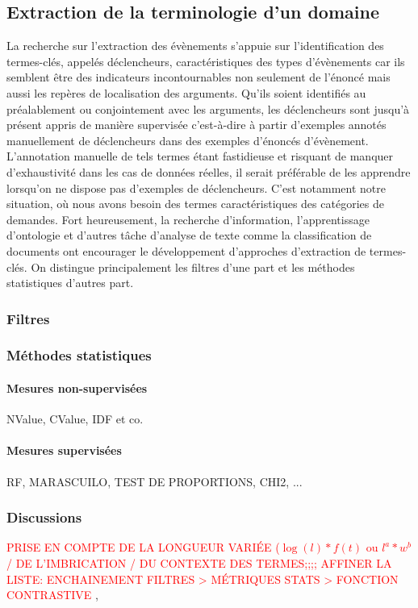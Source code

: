 \subsection{Extraction de la terminologie d'un domaine}
La recherche sur l'extraction des évènements s'appuie sur l'identification des termes-clés, appelés déclencheurs, caractéristiques des types d'évènements car ils semblent être des indicateurs incontournables non seulement de l'énoncé mais aussi les repères de localisation des arguments. Qu'ils soient identifiés au préalablement ou conjointement avec les arguments, les déclencheurs sont jusqu'à présent appris de manière supervisée c'est-à-dire à partir d'exemples annotés manuellement de déclencheurs dans des exemples d'énoncés d'évènement. L'annotation manuelle de tels termes étant fastidieuse et risquant de manquer d'exhaustivité dans les cas de données réelles, il serait préférable de les apprendre lorsqu'on ne dispose pas d'exemples de déclencheurs. C'est notamment notre situation, où nous avons besoin des termes caractéristiques des catégories de demandes. Fort heureusement, la recherche d'information, l'apprentissage d'ontologie et d'autres tâche d'analyse de texte comme la classification de documents ont encourager le développement d'approches d'extraction de termes-clés. On distingue principalement les filtres d'une part et les méthodes statistiques d'autres part.



\subsubsection{Filtres}
\subsubsection{Méthodes statistiques}
\paragraph{Mesures non-supervisées}
NValue, CValue, IDF et co.
\paragraph{Mesures supervisées}
RF, MARASCUILO, TEST DE PROPORTIONS, CHI2, ...
\subsubsection{Discussions}
\textcolor{red}{PRISE EN COMPTE DE LA LONGUEUR VARIÉE ($\log(l) * f(t)$ ou $l^a * w^b$ / DE L'IMBRICATION / DU CONTEXTE DES TERMES;;;; AFFINER LA LISTE: ENCHAINEMENT FILTRES > MÉTRIQUES STATS > FONCTION CONTRASTIVE}
\cite{LossioVentura2014biotex}, \cite{Bonin2010multiwordncvalue}


